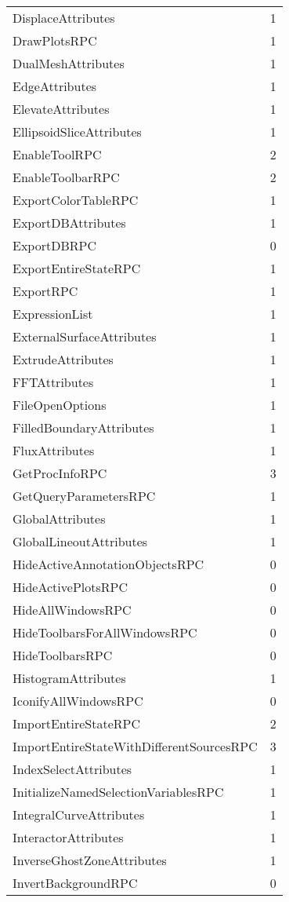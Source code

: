 \documentclass[10pt,a4paper]{report}
\begin{document}
\begin{longtable}{ll}
DisplaceAttributes & 1 \\
DrawPlotsRPC & 1 \\
DualMeshAttributes & 1 \\
EdgeAttributes & 1 \\
ElevateAttributes & 1 \\
EllipsoidSliceAttributes & 1 \\
EnableToolRPC & 2 \\
EnableToolbarRPC & 2 \\
ExportColorTableRPC & 1 \\
ExportDBAttributes & 1 \\
ExportDBRPC & 0 \\
ExportEntireStateRPC & 1 \\
ExportRPC & 1 \\
ExpressionList & 1 \\
ExternalSurfaceAttributes & 1 \\
ExtrudeAttributes & 1 \\
FFTAttributes & 1 \\
FileOpenOptions & 1 \\
FilledBoundaryAttributes & 1 \\
FluxAttributes & 1 \\
GetProcInfoRPC & 3 \\
GetQueryParametersRPC & 1 \\
GlobalAttributes & 1 \\
GlobalLineoutAttributes & 1 \\
HideActiveAnnotationObjectsRPC & 0 \\
HideActivePlotsRPC & 0 \\
HideAllWindowsRPC & 0 \\
HideToolbarsForAllWindowsRPC & 0 \\
HideToolbarsRPC & 0 \\
HistogramAttributes & 1 \\
IconifyAllWindowsRPC & 0 \\
ImportEntireStateRPC & 2 \\
ImportEntireStateWithDifferentSourcesRPC & 3 \\
IndexSelectAttributes & 1 \\
InitializeNamedSelectionVariablesRPC & 1 \\
IntegralCurveAttributes & 1 \\
InteractorAttributes & 1 \\
InverseGhostZoneAttributes & 1 \\
InvertBackgroundRPC & 0 \\

\end{longtable}
\end{document}
